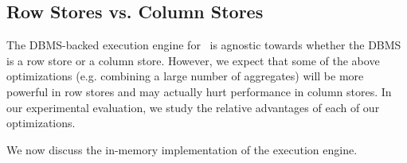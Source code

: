 \subsection{Row Stores vs. Column Stores}
\label{sec:row_store_column_store}
The DBMS-backed execution engine for \SeeDB\ is agnostic towards whether the
DBMS is a row store or a column store. However, we expect that some of the above
optimizations (e.g. combining a large number of aggregates) will be more
powerful in row stores and may actually hurt performance in column stores. In
our experimental evaluation, we study the relative advantages of each of our
optimizations.

We now discuss the in-memory implementation of the execution engine.
